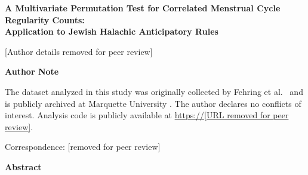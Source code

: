 \documentclass[12pt]{article}
\begin{document}
\begin{titlepage}
  \centering
  \vspace*{3cm}
  {\large\bfseries A Multivariate Permutation Test for Correlated Menstrual Cycle Regularity Counts:\\[4pt]
  \normalfont\large Application to Jewish Halachic Anticipatory Rules\par}
  \vspace{1.5cm}
  {[Author details removed for peer review]\par}
  \vspace{3cm}
  {\normalsize\bfseries Author Note\par}
  \vspace{0.5cm}
  \begin{flushleft}

  \medskip
  The dataset analyzed in this study was originally collected by
  Fehring et al.~\cite{fehring2013} and is publicly archived at Marquette
  University \cite{marquette2013data}. The author declares no conflicts of interest.
  Analysis code is publicly available at \url{https://[URL removed for peer review]}.

  \medskip
  Correspondence: [removed for peer review]
  \end{flushleft}
\end{titlepage}

\newpage
\begin{center}{\bfseries Abstract}\end{center}
\end{document}
